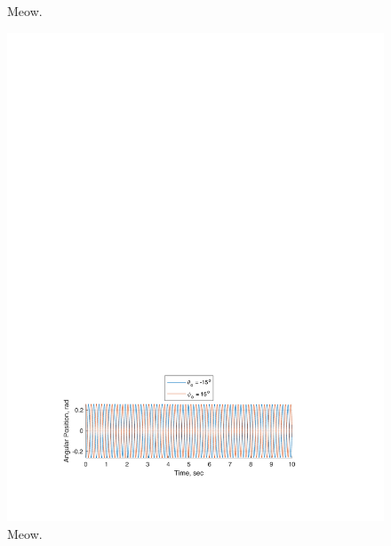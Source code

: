\documentclass[12pt]{report}
\begin{document}
\begin{flushleft}
\begin{figure}[ht]
  \caption{Meow.}
\end{figure}
\begin{figure}[ht]
  \includegraphics[center]{2}
  \caption{Meow.}
\end{figure}
\begin{figure}[ht]

\end{figure}
\end{flushleft}
\end{document}
